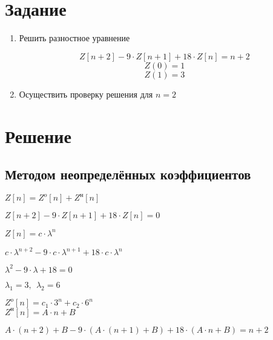 




\section{Задание}

\begin{enumerate}

\item Решить разностное уравнение

\begin{displaymath}
Z[n+2] - 9 \cdot Z[n+1] + 18 \cdot Z[n] = n + 2
\end{displaymath}
\begin{displaymath}
Z(0) = 1
\end{displaymath}
\begin{displaymath}
 Z(1) = 3
\end{displaymath}

\item Осуществить проверку решения для $n = 2$

\end{enumerate}

\section{Решение}

\subsection{Методом неопределённых коэффициентов}

$Z[n] = Z^{o}[n] + Z^{\text{н}}[n]$

$Z[n+2] - 9 \cdot Z[n+1] + 18 \cdot Z[n] = 0$

$Z[n] = c \cdot \lambda^n$

$c \cdot \lambda^{n+2} - 9 \cdot c \cdot \lambda^{n+1} + 18 \cdot c \cdot \lambda^{n}$

$\lambda^2 - 9 \cdot \lambda + 18 = 0$

$\lambda_1 = 3, \ \ \lambda_2 = 6$

$Z^{o}[n] = c_1 \cdot 3^n + c_2 \cdot 6^n$\\[0.3cm]

$Z^{\text{н}}[n] = A \cdot n + B$

$A \cdot (n + 2) + B - 9 \cdot (A \cdot (n + 1) + B) + 18 \cdot (A \cdot n + B) = n + 2$


